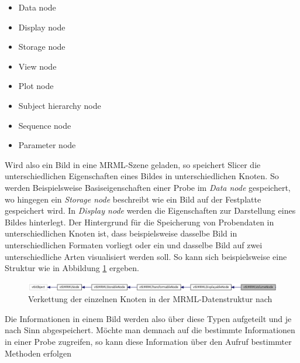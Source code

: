 \begin{minipage}{0.45\textwidth}
	\begin{itemize}
		\item Data node

		\item Display node

		\item Storage node

		\item View node
	\end{itemize}
\end{minipage}
\hfill
\begin{minipage}{0.45\textwidth}
	\begin{itemize}
		\item Plot node

		\item Subject hierarchy node

		\item Sequence node

		\item Parameter node
	\end{itemize}
\end{minipage}

Wird also ein Bild in eine \ac{MRML}-Szene geladen, so speichert Slicer die unterschiedlichen
Eigenschaften eines Bildes in unterschiedlichen Knoten. So werden Beispielsweise
Basiseigenschaften einer Probe im \textit{Data node} gespeichert, wo hingegen
ein \textit{Storage node} beschreibt wie ein Bild auf der Festplatte gespeichert
wird. In \textit{Display node} werden die Eigenschaften zur Darstellung eines Bildes
hinterlegt. Der Hintergrund für die Speicherung von Probendaten in
unterschiedlichen Knoten ist, dass beispielsweise dasselbe Bild in unterschiedlichen
Formaten vorliegt oder ein und dasselbe Bild auf zwei unterschiedliche Arten visualisiert
werden soll. So kann sich beispielsweise eine Struktur wie in Abbildung
\ref{fig:3d_slicer_class} ergeben.

\begin{figure}[h]
	\centering
	\includegraphics[width=1\textwidth]{img/slicer_class_index.jpg}
	\caption{Verkettung der einzelnen Knoten in der MRML-Datenstruktur nach \citet{slicer2024}}
	\label{fig:3d_slicer_class}
\end{figure}

Die Informationen in einem Bild werden also über diese Typen aufgeteilt und je nach
Sinn abgespeichert. Möchte man demnach auf die bestimmte Informationen in einer
Probe zugreifen, so kann diese Information über den Aufruf bestimmter Methoden erfolgen

